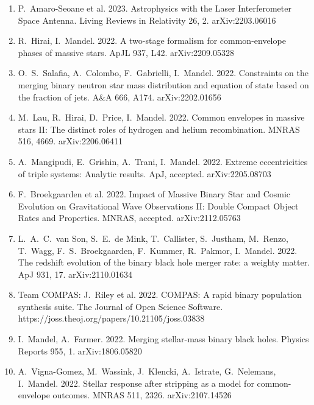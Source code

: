 \documentclass[margin,line]{res}
\begin{document}
\begin{resume}
\begin{enumerate}
\item P.~Amaro-Seoane et al. 2023.  Astrophysics with the Laser Interferometer Space Antenna.  Living Reviews in Relativity 26, 2.  arXiv:2203.06016

\item R.~Hirai, I.~Mandel. 2022.  A two-stage formalism for common-envelope phases of massive stars.  ApJL 937, L42.  arXiv:2209.05328

\item O.~S.~Salafia, A.~Colombo, F.~Gabrielli, I.~Mandel. 2022. Constraints on the merging binary neutron star mass distribution and equation of state based on the fraction of jets.  A\&A 666, A174. arXiv:2202.01656

\item M.~Lau, R.~Hirai, D.~Price, I.~Mandel.  2022.  Common envelopes in massive stars II: The distinct roles of hydrogen and helium recombination.  MNRAS 516, 4669. arXiv:2206.06411 

\item A.~Mangipudi, E.~Grishin, A.~Trani, I.~Mandel. 2022. Extreme eccentricities of triple systems: Analytic results.  ApJ, accepted.  arXiv:2205.08703

\item F.~Broekgaarden et al.  2022.  Impact of Massive Binary Star and Cosmic Evolution on Gravitational Wave Observations II: Double Compact Object Rates and Properties.  MNRAS, accepted.  arXiv:2112.05763

\item L.~A.~C.~van Son, S.~E.~de Mink, T.~Callister, S.~Justham, M.~Renzo, T.~Wagg, F.~S.~Broekgaarden, F.~Kummer, R.~Pakmor, I.~Mandel.  2022.  The redshift evolution of the binary black hole merger rate: a weighty matter.  ApJ 931, 17.  arXiv:2110.01634 

\item Team COMPAS: J.~Riley et al. 2022.  COMPAS: A rapid binary population synthesis suite.  The Journal of Open Science Software.  https://joss.theoj.org/papers/10.21105/joss.03838

\item I.~Mandel, A.~Farmer.  2022.  Merging stellar-mass binary black holes.  Physics Reports 955, 1.  arXiv:1806.05820

\item A.~Vigna-Gomez, M.~Wassink, J.~Klencki, A.~Istrate, G.~Nelemans, I.~Mandel.  2022. Stellar response after stripping as a model for common-envelope outcomes. MNRAS 511, 2326.  arXiv:2107.14526


\end{enumerate}
\end{resume}
\end{document}
